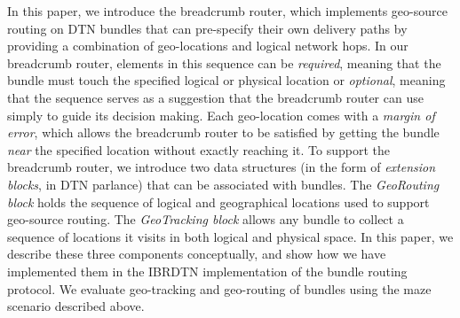 In this paper, we introduce the {\sc breadcrumb} router, which implements geo-source routing on DTN bundles that can pre-specify their own delivery paths by providing a combination of geo-locations and logical network hops. In our {\sc breadcrumb} router, elements in this sequence can be {\em required}, meaning that the bundle must touch the specified logical or physical location or {\em optional}, meaning that the sequence serves as a suggestion that the {\sc breadcrumb} router can use simply to guide its decision making. Each geo-location comes with a {\em margin of error}, which allows the {\sc breadcrumb} router to be satisfied by getting the bundle {\em near} the specified location without exactly reaching it. To support the {\sc breadcrumb} router, we introduce two data structures (in the form of {\em extension blocks}, in DTN parlance) that can be associated with bundles. The {\em GeoRouting block} holds the sequence of logical and geographical locations used to support geo-source routing. The {\em GeoTracking block} allows any bundle to collect a sequence of locations it visits in both logical and physical space. In this paper, we describe these three components conceptually, and show how we have implemented them in the IBRDTN implementation of the bundle routing protocol. We evaluate geo-tracking and geo-routing of bundles using the maze scenario described above.





